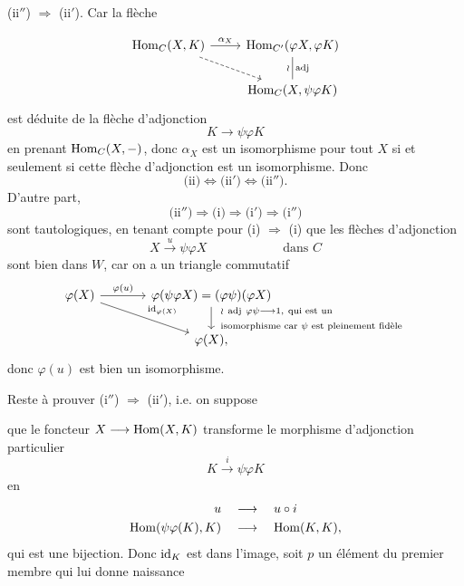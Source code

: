 (ii$''$) $\Longrightarrow$ (ii$'$). Car la flèche


\[
\begin{tikzcd}
\Hom_C(X,K) \arrow[r,"\alpha_X"] \arrow[dr,dashed] & \Hom_{C'}(\varphi X,\varphi K) \arrow[d,dash,"\wr"',"\mathrm{adj}"] \\
 & \Hom_C(X,\psi\varphi K)
\end{tikzcd}
\]
est déduite de la flèche d'adjonction
\[
K \longrightarrow \psi\varphi K
\]
en prenant $\mathrm{Hom}_C(X,-)$, donc $\alpha_X$ est un isomorphisme pour tout $X$ si et seulement si cette flèche d'adjonction est un isomorphisme. Donc
\[
\text{(ii)} \Longleftrightarrow \text{(ii$'$)} \Longleftrightarrow \text{(ii$''$)}.
\]
D'autre part,
\[
\text{(ii$''$)} \Longrightarrow \text{(i)} \Longrightarrow \text{(i$'$)} \Longrightarrow \text{(i$''$)}
\]
sont tautologiques, en tenant compte pour (i) $\Longrightarrow$ (i) que les flèches d'adjonction
\[
X \xrightarrow{u} \psi\varphi X \qquad\qquad\qquad \text{dans } C
\]
sont bien dans $W$, car on a un triangle commutatif
\[
\begin{tikzcd}[column sep=large]
\varphi(X) \arrow[r,"\varphi(u)"] \arrow[dr,"\id_{\varphi(X)}"] & \varphi(\psi\varphi X) = (\varphi\psi)(\varphi X) \arrow[d,"{\begin{array}{l}\wr\ \mathrm{adj}\ \varphi\psi \longrightarrow 1,\ \text{qui est un}\\ \text{isomorphisme car } \psi \text{ est pleinement fidèle}\end{array}}"] \\
 & \varphi(X),
\end{tikzcd}
\]
donc $\varphi(u)$ est bien un isomorphisme.

Reste à prouver (i$''$) $\Longrightarrow$ (ii$'$), i.e. on suppose

\noindent{}%
que le foncteur $X \longrightarrow \mathrm{Hom}(X,K)$ transforme le morphisme d'adjonction particulier
\[
K \xrightarrow{i} \psi\varphi K
\]
en
\[
\begin{aligned}
u \quad &\longrightarrow \quad u\circ i\\
\mathrm{Hom}(\psi\varphi(K),K) \quad &\longrightarrow \quad \mathrm{Hom}(K,K),
\end{aligned}
\]
qui est une bijection. Donc $\mathrm{id}_K$ est dans l'image, soit $p$ un élément du premier membre qui lui donne naissance


